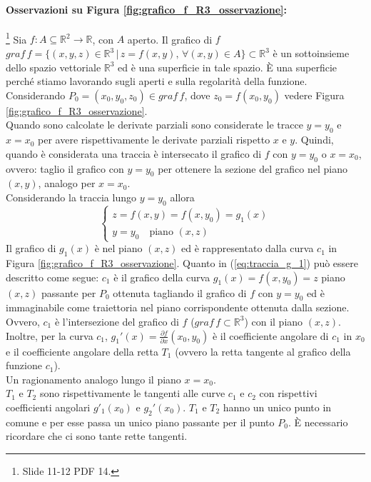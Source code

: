\paragraph{Osservazioni su Figura \ref{fig:grafico_f_R3_osservazione}:}\footnote{Slide 11-12 PDF 14.}
Sia $f\colon A\subseteq\mathbb R^2\rightarrow\mathbb R$, con $A$ aperto. Il grafico di $f$ $graf\,f=\{(x,y,z)\in\mathbb R^3\,|\, z=f(x,y),\, \forall (x,y)\in A\}\subset\mathbb R^3$ è un sottoinsieme dello spazio vettoriale $\mathbb R^3$ ed è una superficie in tale spazio. È una superficie perché stiamo lavorando sugli aperti e sulla regolarità della funzione.\\
Considerando $P_0=(x_0,y_0,z_0)\in graf\, f$, dove $z_0=f(x_0,y_0)$ vedere Figura \ref{fig:grafico_f_R3_osservazione}.\\
Quando sono calcolate le derivate parziali sono considerate le tracce $y=y_0$ e $x=x_0$ per avere rispettivamente le derivate parziali rispetto $x$ e $y$. Quindi, quando è considerata una traccia è intersecato il grafico di $f$ con $y=y_0$ o $x=x_0$, ovvero: taglio il grafico con $y=y_0$ per ottenere la sezione del grafico nel piano $(x,y)$, analogo per $x=x_0$.\\
Considerando la traccia lungo $y=y_0$ allora
\begin{equation}\label{eq:traccia_g_1}
    \begin{cases}
        z=f(x,y)=f(x,y_0)=g_1(x)\\
        y=y_0\quad \text{piano }(x,z)
    \end{cases}
\end{equation}
Il grafico di $g_1(x)$ è nel piano $(x,z)$ ed è rappresentato dalla curva $c_1$ in Figura \ref{fig:grafico_f_R3_osservazione}. Quanto in (\ref{eq:traccia_g_1}) può essere descritto come segue: $c_1$ è il grafico della curva $g_1(x)=f(x,y_0)=z$ piano $(x,z)$ passante per $P_0$ ottenuta tagliando il grafico di $f$ con $y=y_0$ ed è immaginabile come traiettoria nel piano corrispondente ottenuta dalla sezione. Ovvero, $c_1$ è l'intersezione del grafico di $f$ ($graf\, f\subset\mathbb R^3$) con il piano $(x,z)$. Inoltre, per la curva $c_1$, $g_1'(x)=\frac{\partial f}{\partial x}(x_0,y_0)$ è il coefficiente angolare di $c_1$ in $x_0$ e il coefficiente angolare della retta $T_1$ (ovvero la retta tangente al grafico della funzione $c_1$).\\
Un ragionamento analogo lungo il piano $x=x_0$.\\
 $T_1$ e $T_2$ sono rispettivamente le tangenti alle curve $c_1$ e $c_2$ con rispettivi coefficienti angolari $g'_1(x_0)$ e $g_2'(x_0)$. $T_1$ e $T_2$ hanno un unico punto in comune e per esse passa un unico piano passante per il punto $P_0$. È necessario ricordare che ci sono tante rette tangenti.\\
